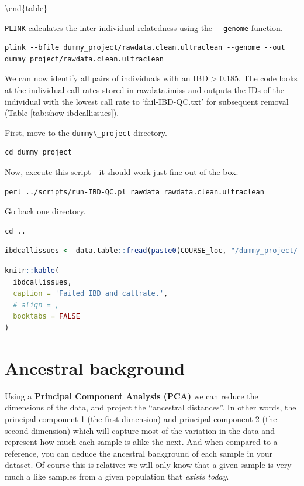\documentclass[
]{book}
\newcommand{\passthrough}[1]{#1}
\begin{document}
\textbackslash end\{table\}

\passthrough{\lstinline!PLINK!} calculates the inter-individual relatedness using the \passthrough{\lstinline!--genome!} function.

\begin{lstlisting}
plink --bfile dummy_project/rawdata.clean.ultraclean --genome --out dummy_project/rawdata.clean.ultraclean
\end{lstlisting}

We can now identify all pairs of individuals with an IBD \textgreater{} 0.185. The code looks at the individual call rates stored in rawdata.imiss and outputs the IDs of the individual with the lowest call rate to `fail-IBD-QC.txt' for subsequent removal (Table \ref{tab:show-ibdcallissues}).

First, move to the \passthrough{\lstinline!dummy\_project!} directory.

\begin{lstlisting}
cd dummy_project
\end{lstlisting}

Now, execute this script - it should work just fine out-of-the-box.

\begin{lstlisting}
perl ../scripts/run-IBD-QC.pl rawdata rawdata.clean.ultraclean
\end{lstlisting}

Go back one directory.

\begin{lstlisting}
cd ..
\end{lstlisting}

\begin{lstlisting}[language=R]
ibdcallissues <- data.table::fread(paste0(COURSE_loc, "/dummy_project/fail-IBD-QC.txt"))
\end{lstlisting}

\begin{lstlisting}[language=R]
knitr::kable(
  ibdcallissues, 
  caption = 'Failed IBD and callrate.',
  # align = ,
  booktabs = FALSE
)
\end{lstlisting}

\hypertarget{ancestral-background}{%
\section{Ancestral background}\label{ancestral-background}}

Using a \textbf{Principal Component Analysis (PCA)} we can reduce the dimensions of the data, and project the ``ancestral distances''. In other words, the principal component 1 (the first dimension) and principal component 2 (the second dimension) which will capture most of the variation in the data and represent how much each sample is alike the next. And when compared to a reference, you can deduce the ancestral background of each sample in your dataset. Of course this is relative: we will only know that a given sample is very much a like samples from a given population that \emph{exists today}.
\end{document}
